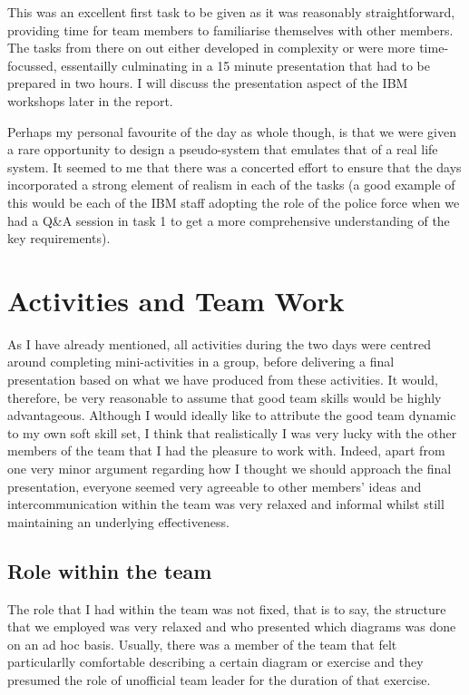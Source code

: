\documentclass[12pt]{article} %
\begin{document}
This was an excellent first task to be given as it was reasonably straightforward, providing time for team members to familiarise themselves with other members. The tasks from there on out either developed in complexity or were more time-focussed, essentailly culminating in a 15 minute presentation that had to be prepared in two hours. I will discuss the presentation aspect of the IBM workshops later in the report.

Perhaps my personal favourite of the day as whole though, is that we were given a rare opportunity to design a pseudo-system that emulates that of a real life system. It seemed to me that there was a concerted effort to ensure that the days incorporated a strong element of realism in each of the tasks (a good example of this would be each of the IBM staff adopting the role of the police force when we had a Q\&A session in task 1 to get a more comprehensive understanding of the key requirements).

\section{Activities and Team Work}

As I have already mentioned, all activities during the two days were centred around completing mini-activities in a group, before delivering a final presentation based on what we have produced from these activities. It would, therefore, be very reasonable to assume that good team skills would be highly advantageous. Although I would ideally like to attribute the good team dynamic to my own soft skill set, I think that realistically I was very lucky with the other members of the team that I had the pleasure to work with. Indeed, apart from one very minor argument regarding how I thought we should approach the final presentation, everyone seemed very agreeable to other members' ideas and intercommunication within the team was very relaxed and informal whilst still maintaining an underlying effectiveness.

\subsection{Role within the team}

The role that I had within the team was not fixed, that is to say, the structure that we employed was very relaxed and who presented which diagrams was done on an ad hoc basis. Usually, there was a member of the team that felt particularlly comfortable describing a certain diagram or exercise and they presumed the role of unofficial team leader for the duration of that exercise. 
\end{document}
